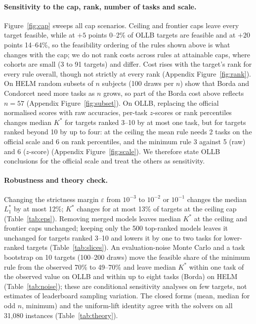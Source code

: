 \paragraph{Sensitivity to the cap, rank, number of tasks and scale.}
Figure~\ref{fig:cap} sweeps all cap scenarios.
Ceiling and frontier caps leave every target feasible, while at $+5$ points 0--2\% of OLLB targets are feasible and at $+20$ points 14--64\%, so the feasibility ordering of the rules shown above is what changes with the cap; we do not rank costs across rules at attainable caps, where cohorts are small (3 to 91 targets) and differ.
Cost rises with the target's rank for every rule overall, though not strictly at every rank (Appendix Figure~\ref{fig:rank}).
On HELM random subsets of $n$ subjects (100 draws per $n$) show that Borda and Condorcet need more tasks as $n$ grows, so part of the Borda cost above reflects $n=57$ (Appendix Figure~\ref{fig:subset}).
On OLLB, replacing the official normalised scores with raw accuracies, per-task $z$-scores or rank percentiles changes median $K^\ast$ for targets ranked 3--10 by at most one task, but for targets ranked beyond 10 by up to four: at the ceiling the mean rule needs 2 tasks on the official scale and 6 on rank percentiles, and the minimum rule 3 against 5 (raw) and 6 ($z$-score) (Appendix Figure~\ref{fig:scale}). We therefore state OLLB conclusions for the official scale and treat the others as sensitivity.


\paragraph{Robustness and theory check.}
Changing the strictness margin $\varepsilon$ from $10^{-3}$ to $10^{-2}$ or $10^{-1}$ changes the median $L_1^\ast$ by at most 12\%; $K^\ast$ changes for at most 13\% of targets at the ceiling cap (Table~\ref{tab:eps}).
Removing merged models leaves median $K^\ast$ at the ceiling and frontier caps unchanged; keeping only the 500 top-ranked models leaves it unchanged for targets ranked 3--10 and lowers it by one to two tasks for lower-ranked targets (Table~\ref{tab:slices}).
An evaluation-noise Monte Carlo and a task bootstrap on 10 targets (100--200 draws) move the feasible share of the minimum rule from the observed 70\% to 49--70\% and leave median $K^\ast$ within one task of the observed value on OLLB and within up to eight tasks (Borda) on HELM (Table~\ref{tab:noise}); these are conditional sensitivity analyses on few targets, not estimates of leaderboard sampling variation.
The closed forms (mean, median for odd $n$, minimum) and the uniform-lift identity agree with the solvers on all 31{,}080 instances (Table~\ref{tab:theory}).
